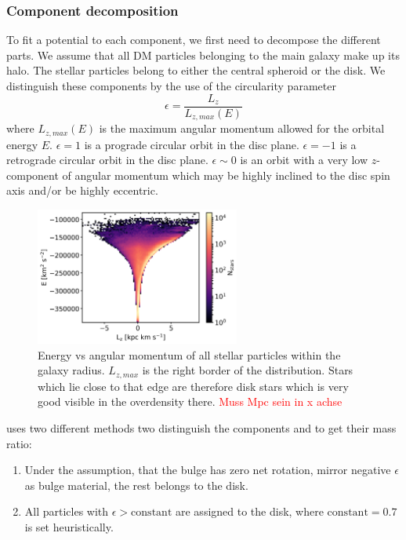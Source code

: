 \subsubsection{Component decomposition}\label{subsubsec:decomp}
To fit a potential to each component, we first need to decompose the different parts. We assume that all \ac{DM} particles belonging to the main galaxy make up its halo. The stellar particles belong to either the central spheroid or the disk. We distinguish these components by the use of the circularity parameter \citep{Abadi...circularity...2003}
\begin{equation}\label{eq:circularity}
    \epsilon = \frac{L_z}{L_{z,max}(E)}
\end{equation}
where $L_{z,max}(E)$ is the maximum angular momentum allowed for the orbital energy $E$. 
$\epsilon = 1$ is a prograde circular orbit in the disc plane. $\epsilon = -1$ is a retrograde circular orbit in the disc plane. $\epsilon \sim 0$ is an orbit with a very low $z$-component of angular momentum which may be highly inclined to the disc spin axis and/or be highly eccentric.  
\begin{figure}
\captionsetup{format=plain}
    \centering
    \includegraphics[width = 0.6\textwidth]{plots/Auriga/decomposition_elz_snap_127.png}
    \caption{Energy vs angular momentum of all stellar particles within the galaxy radius. $L_{z,max}$ is the right border of the distribution. Stars which lie close to that edge are therefore disk stars which is very good visible in the overdensity there. \textcolor{red}{Muss Mpc sein in x achse}}
    \label{fig:e_lz_dist}
\end{figure}
\cite{AurigaGrand} uses two different methods two distinguish the components and to get their mass ratio:
\begin{enumerate}
\item Under the assumption, that the bulge has zero net rotation, mirror negative $\epsilon$ as bulge material, the rest belongs to the disk.
\item All particles with $\epsilon > \mathrm{constant}$ are assigned to the disk, where $\mathrm{constant} = 0.7$ is set heuristically.
\end{enumerate}

